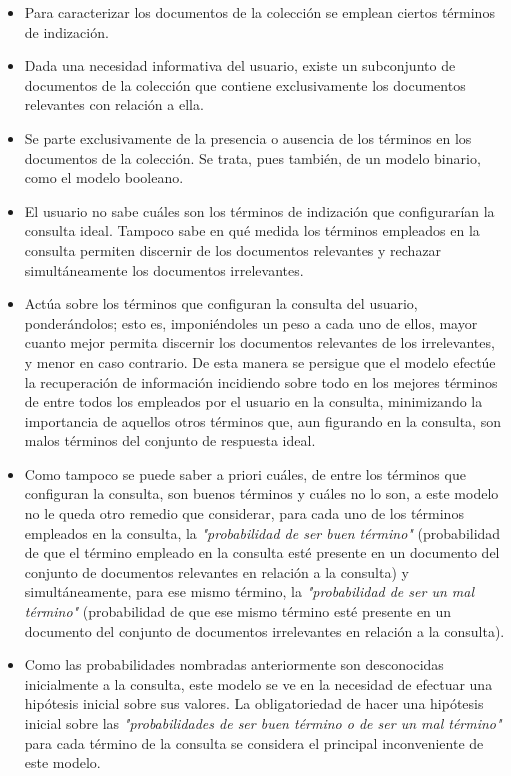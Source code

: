 \documentclass{article}
\begin{document}
\begin{itemize}
	\item Para caracterizar los documentos de la colección se emplean ciertos términos de indización.
	
	\item Dada una necesidad informativa del usuario, existe un subconjunto de documentos de la colección que contiene exclusivamente los documentos relevantes con relación a ella.
	
	\item Se parte exclusivamente de la presencia o ausencia de los términos en los documentos de la colección. Se trata, pues también, de un modelo binario, como el modelo booleano.
	
	\item El usuario no sabe cuáles son los términos de indización que configurarían la consulta ideal. Tampoco sabe en qué medida los términos empleados en la consulta permiten discernir de los documentos relevantes y rechazar simultáneamente los documentos irrelevantes.
	
	\item Actúa sobre los términos que configuran la consulta del usuario, ponderándolos; esto es, imponiéndoles un peso a cada uno de ellos, mayor cuanto mejor permita discernir los documentos relevantes de los irrelevantes, y menor en caso contrario. De esta manera se persigue que el modelo efectúe la recuperación de información incidiendo sobre todo en los mejores términos de entre todos los empleados por el usuario en la consulta, minimizando la importancia de aquellos otros términos que, aun figurando en la consulta, son malos términos del conjunto de respuesta ideal.
	
	\item Como tampoco se puede saber a priori cuáles, de entre los términos que configuran la consulta, son buenos términos y cuáles no lo son, a este modelo no le queda otro remedio que considerar, para cada uno de los términos empleados en la consulta, la \textit{"probabilidad de ser buen término"} (probabilidad de que el término empleado en la consulta esté presente en un documento del conjunto de documentos relevantes en relación a la consulta) y simultáneamente, para ese mismo término, la \textit{"probabilidad de ser un mal término"} (probabilidad de que ese mismo término esté presente en un documento del conjunto de documentos irrelevantes en relación a la consulta).
	
	\item Como las probabilidades nombradas anteriormente son desconocidas inicialmente a la consulta, este modelo se ve en la necesidad de efectuar una hipótesis inicial sobre sus valores. La obligatoriedad de hacer una hipótesis inicial sobre las \textit{"probabilidades de ser buen término o de ser un mal término"} para cada término de la consulta se considera el principal inconveniente de este modelo. 
\end{itemize}
\end{document}

